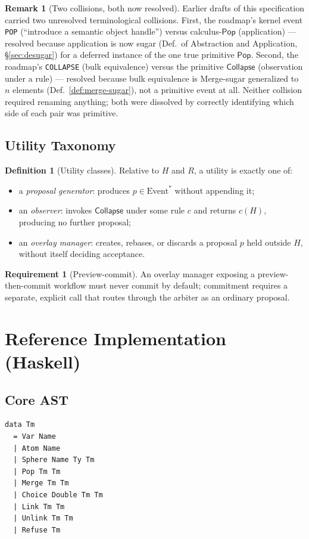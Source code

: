 \documentclass[12pt]{article}
\newcommand{\Pop}{\mathsf{Pop}}
\theoremstyle{definition}
\newtheorem{definition}{Definition}
\newtheorem{remark}{Remark}
\newtheorem{requirement}{Requirement}
\newcommand{\Hist}{H}
\newcommand{\Replay}{R}
\newcommand{\EventStar}{\mathrm{Event}^{*}}
\newcommand{\CollapseOp}{\mathsf{Collapse}}
\begin{document}
\begin{remark}[Two collisions, both now resolved]
Earlier drafts of this specification carried two unresolved terminological collisions. First, the roadmap's kernel event \texttt{POP} (``introduce a semantic object handle'') versus calculus-$\Pop$ (application) — resolved because application is now sugar (Def.\ of Abstraction and Application, \S\ref{sec:desugar}) for a deferred instance of the one true primitive $\Pop$. Second, the roadmap's \texttt{COLLAPSE} (bulk equivalence) versus the primitive $\CollapseOp$ (observation under a rule) — resolved because bulk equivalence is Merge-sugar generalized to $n$ elements (Def.~\ref{def:merge-sugar}), not a primitive event at all. Neither collision required renaming anything; both were dissolved by correctly identifying which side of each pair was primitive.
\end{remark}

\subsection{Utility Taxonomy}

\begin{definition}[Utility classes]
Relative to $\Hist$ and $\Replay$, a utility is exactly one of:
\begin{itemize}
\item a \emph{proposal generator}: produces $p \in \EventStar$ without appending it;
\item an \emph{observer}: invokes $\CollapseOp$ under some rule $c$ and returns $c(\Hist)$, producing no further proposal;
\item an \emph{overlay manager}: creates, rebases, or discards a proposal $p$ held outside $\Hist$, without itself deciding acceptance.
\end{itemize}
\end{definition}

\begin{requirement}[Preview-commit]
An overlay manager exposing a preview-then-commit workflow must never commit by default; commitment requires a separate, explicit call that routes through the arbiter as an ordinary proposal.
\end{requirement}

\section{Reference Implementation (Haskell)}
\subsection{Core AST}
\begin{verbatim}
data Tm
  = Var Name
  | Atom Name
  | Sphere Name Ty Tm
  | Pop Tm Tm
  | Merge Tm Tm
  | Choice Double Tm Tm
  | Link Tm Tm
  | Unlink Tm Tm
  | Refuse Tm
\end{verbatim}
\end{document}
